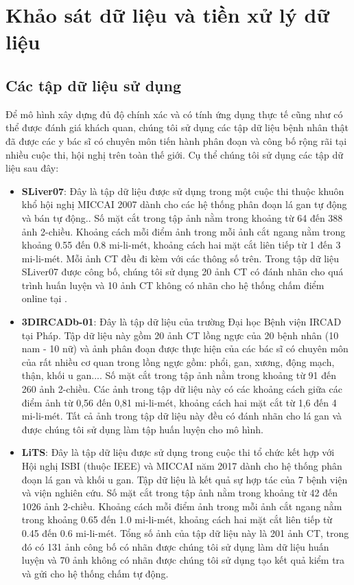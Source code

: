 \chapter{Khảo sát dữ liệu và tiền xử lý dữ liệu}
\section{Các tập dữ liệu sử dụng}
Để mô hình xây dựng đủ độ chính xác và có tính ứng dụng thực tế cũng như có thể được đánh giá khách quan, chúng tôi sử dụng các tập dữ liệu bệnh nhân thật đã được các y bác sĩ có chuyên môn tiến hành phân đoạn và công bố rộng rãi tại nhiều cuộc thi, hội nghị trên toàn thế giới. Cụ thể chúng tôi sử dụng các tập dữ liệu sau đây:
\begin{itemize}
    \item \textbf{SLiver07}: Đây là tập dữ liệu được sử dụng trong một cuộc thi thuộc khuôn khổ hội nghị MICCAI 2007 dành cho các hệ thống phân đoạn lá gan tự động và bán tự động.. Số mặt cắt trong tập ảnh nằm trong khoảng từ 64 đến 388 ảnh 2-chiều.  Khoảng cách mỗi điểm ảnh trong mỗi ảnh cắt ngang nằm trong khoảng 0.55 đến 0.8 mi-li-mét, khoảng cách hai mặt cắt liên tiếp từ 1 đến 3 mi-li-mét. Mỗi ảnh CT đều đi kèm với các thông số trên. Trong tập dữ liệu SLiver07 được công bố, chúng tôi sử dụng 20 ảnh CT có đánh nhãn cho quá trình huấn luyện và 10 ảnh CT không có nhãn cho hệ thống chấm điểm online tại \cite{website:slvier07}.
    \item \textbf{3DIRCADb-01}: Đây là tập dữ liệu của trường Đại học Bệnh viện IRCAD tại Pháp. Tập dữ liệu này gồm 20 ảnh CT lồng ngực của 20 bệnh nhân (10 nam - 10 nữ) và ảnh phân đoạn được thực hiện của các bác sĩ có chuyên môn của rất nhiều cơ quan trong lồng ngực gồm: phổi, gan, xương, động mạch, thận, khối u gan.... Số mặt cắt trong tập ảnh nằm trong khoảng từ 91 đến 260 ảnh 2-chiều. Các ảnh trong tập dữ liệu này có các khoảng cách giữa các điểm ảnh từ 0,56 đến 0,81 mi-li-mét, khoảng cách hai mặt cắt từ 1,6 đến 4 mi-li-mét. Tất cả ảnh trong tập dữ liệu này đều có đánh nhãn cho lá gan và được chúng tôi sử dụng làm tập huấn luyện cho mô hình.
    \item \textbf{LiTS}: Đây là tập dữ liệu được sử dụng trong cuộc thi tổ chức kết hợp với Hội nghị ISBI (thuộc IEEE) và MICCAI năm 2017 dành cho hệ thống phân đoạn lá gan và khối u gan. Tập dữ liệu là kết quả sự hợp tác của 7 bệnh viện và viện nghiên cứu. Số mặt cắt trong tập ảnh nằm trong khoảng từ 42 đến 1026 ảnh 2-chiều. Khoảng cách mỗi điểm ảnh trong mỗi ảnh cắt ngang nằm trong khoảng 0.65 đến 1.0 mi-li-mét, khoảng cách hai mặt cắt liên tiếp từ 0.45 đến 0.6 mi-li-mét. Tổng số ảnh của tập dữ liệu này là 201 ảnh CT, trong đó có 131 ảnh công bố có nhãn được chúng tôi sử dụng làm dữ liệu huấn luyện và 70 ảnh không có nhãn được chúng tôi sử dụng tạo kết quả kiểm tra và gửi cho hệ thống chấm tự động.
\end{itemize}
